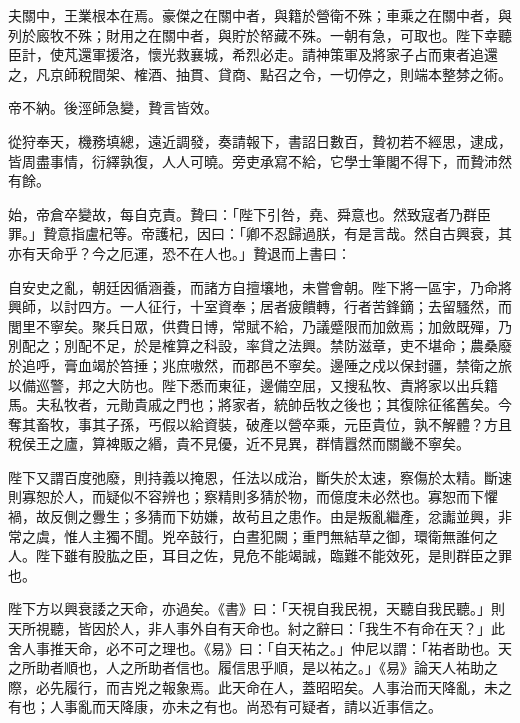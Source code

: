 \begin{pinyinscope}
 夫關中，王業根本在焉。豪傑之在關中者，與籍於營衛不殊；車乘之在關中者，與列於廄牧不殊；財用之在關中者，與貯於帑藏不殊。一朝有急，可取也。陛下幸聽臣計，使芃還軍援洛，懷光救襄城，希烈必走。請神策軍及將家子占而東者追還之，凡京師稅間架、榷酒、抽貫、貸商、點召之令，一切停之，則端本整棼之術。



 帝不納。後涇師急變，贄言皆效。



 從狩奉天，機務填總，遠近調發，奏請報下，書詔日數百，贄初若不經思，逮成，皆周盡事情，衍繹孰復，人人可曉。旁吏承寫不給，它學士筆閣不得下，而贄沛然有餘。



 始，帝倉卒變故，每自克責。贄曰：「陛下引咎，堯、舜意也。然致寇者乃群臣罪。」贄意指盧杞等。帝護杞，因曰：「卿不忍歸過朕，有是言哉。然自古興衰，其亦有天命乎？今之厄運，恐不在人也。」贄退而上書曰：



 自安史之亂，朝廷因循涵養，而諸方自擅壤地，未嘗會朝。陛下將一區宇，乃命將興師，以討四方。一人征行，十室資奉；居者疲饋轉，行者苦鋒鏑；去留騷然，而閭里不寧矣。聚兵日眾，供費日博，常賦不給，乃議蹙限而加斂焉；加斂既殫，乃別配之；別配不足，於是榷算之科設，率貸之法興。禁防滋章，吏不堪命；農桑廢於追呼，膏血竭於笞捶；兆庶嗷然，而郡邑不寧矣。邊陲之戍以保封疆，禁衛之旅以備巡警，邦之大防也。陛下悉而東征，邊備空屈，又搜私牧、責將家以出兵籍馬。夫私牧者，元勛貴戚之門也；將家者，統帥岳牧之後也；其復除征徭舊矣。今奪其畜牧，事其子孫，丐假以給資裝，破產以營卒乘，元臣貴位，孰不解體？方且稅侯王之廬，算裨販之緡，貴不見優，近不見異，群情囂然而關畿不寧矣。



 陛下又謂百度弛廢，則持義以掩恩，任法以成治，斷失於太速，察傷於太精。斷速則寡恕於人，而疑似不容辨也；察精則多猜於物，而億度未必然也。寡恕而下懼禍，故反側之釁生；多猜而下妨嫌，故茍且之患作。由是叛亂繼產，忿讟並興，非常之虞，惟人主獨不聞。兇卒鼓行，白晝犯闕；重門無結草之御，環衛無誰何之人。陛下雖有股肱之臣，耳目之佐，見危不能竭誠，臨難不能效死，是則群臣之罪也。



 陛下方以興衰諉之天命，亦過矣。《書》曰：「天視自我民視，天聽自我民聽。」則天所視聽，皆因於人，非人事外自有天命也。紂之辭曰：「我生不有命在天？」此舍人事推天命，必不可之理也。《易》曰：「自天祐之。」仲尼以謂：「祐者助也。天之所助者順也，人之所助者信也。履信思乎順，是以祐之。」《易》論天人祐助之際，必先履行，而吉兇之報象焉。此天命在人，蓋昭昭矣。人事治而天降亂，未之有也；人事亂而天降康，亦未之有也。尚恐有可疑者，請以近事信之。




\end{pinyinscope}

